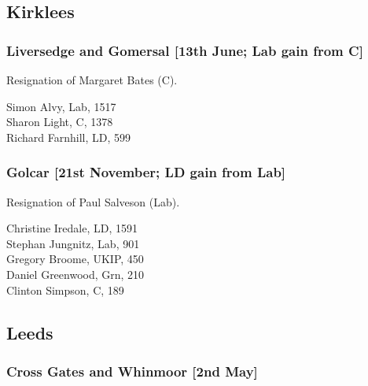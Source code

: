\documentclass[a4paper,openany,10pt]{book}
\begin{document}
\subsection*{Kirklees}

\subsubsection*{Liversedge and Gomersal \hspace*{\fill}\nolinebreak[1]%
\enspace\hspace*{\fill}
[13th June; Lab gain from C]}


Resignation of Margaret Bates (C).



Simon Alvy, Lab, 1517\\
Sharon Light, C, 1378\\
Richard Farnhill, LD, 599\\


\subsubsection*{Golcar \hspace*{\fill}\nolinebreak[1]%
\enspace\hspace*{\fill}
[21st November; LD gain from Lab]}


Resignation of Paul Salveson (Lab).



Christine Iredale, LD, 1591\\
Stephan Jungnitz, Lab, 901\\
Gregory Broome, UKIP, 450\\
Daniel Greenwood, Grn, 210\\
Clinton Simpson, C, 189\\


\subsection*{Leeds}

\subsubsection*{Cross Gates and Whinmoor \hspace*{\fill}\nolinebreak[1]%
\enspace\hspace*{\fill}
[2nd May]}
\end{document}
